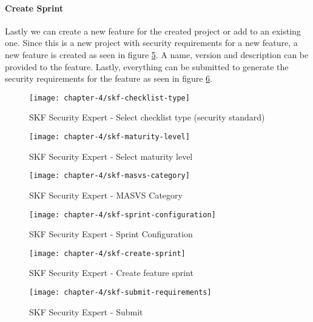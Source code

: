 \paragraph{Create Sprint}
Lastly we can create a new feature for the created project or add to an existing one. Since this is a new project with security requirements for a new feature, a new feature is created as seen in figure \ref{fig:skf-feature-sprint}. A name, version and description can be provided to the feature. Lastly, everything can be submitted to generate the security requirements for the feature as seen in figure \ref{fig:skf-submit}.

\begin{figure}
    \centering
    \texttt{[image: chapter-4/skf-checklist-type]}
    \caption{SKF Security Expert - Select checklist type (security standard)}
    \label{fig:skf-checklist-type}
\end{figure}

\begin{figure}
    \centering
    \texttt{[image: chapter-4/skf-maturity-level]}
    \caption{SKF Security Expert - Select maturity level}
    \label{fig:skf-maturity-level}
\end{figure}

\begin{figure}
    \centering
    \texttt{[image: chapter-4/skf-masvs-category]}
    \caption{SKF Security Expert - MASVS Category}
    \label{fig:skf-masvs-category}
\end{figure}

\begin{figure}
    \centering
    \texttt{[image: chapter-4/skf-sprint-configuration]}
    \caption{SKF Security Expert - Sprint Configuration}
    \label{fig:skf-sprint-configuration}
\end{figure}

\begin{figure}
    \centering
    \texttt{[image: chapter-4/skf-create-sprint]}
    \caption{SKF Security Expert - Create feature sprint}
    \label{fig:skf-feature-sprint}
\end{figure}

\begin{figure}
    \centering
    \texttt{[image: chapter-4/skf-submit-requirements]}
    \caption{SKF Security Expert - Submit}
    \label{fig:skf-submit}
\end{figure}

